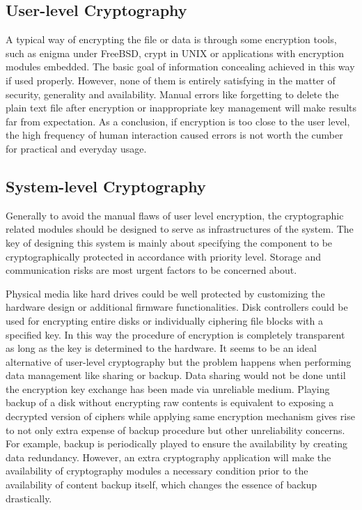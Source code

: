 \subsection{User-level Cryptography}

A typical way of encrypting the file or data is through some encryption tools, such as enigma under FreeBSD, crypt in UNIX or applications with encryption modules embedded. The basic goal of information concealing achieved in this way if used properly. However, none of them is entirely satisfying in the matter of security, generality and availability\cite{Zhang2010}. Manual errors like forgetting to delete the plain text file after encryption or inappropriate key management will make results far from expectation. As a conclusion, if encryption is too close to the user level, the high frequency of human interaction caused errors is not worth the cumber for practical and everyday usage\cite{Laboratories1993}.

\subsection{System-level Cryptography}

Generally to avoid the manual flaws of user level encryption, the cryptographic related modules should be designed to serve as infrastructures of the system. The key of designing this system is mainly about specifying the component to be cryptographically protected in accordance with priority level. Storage and communication risks are most urgent factors to be concerned about.

Physical media like hard drives could be well protected by customizing the hardware design or additional firmware functionalities. Disk controllers could be used for encrypting entire disks or individually ciphering file blocks with a specified key. In this way the procedure of encryption is completely transparent as long as the key is determined to the hardware\cite{Laboratories1993}. It seems to be an ideal alternative of user-level cryptography but the problem happens when performing data management like sharing or backup. Data sharing would not be done until the encryption key exchange has been made via unreliable medium. Playing backup of a disk without encrypting raw contents is equivalent to exposing a decrypted version of ciphers while applying same encryption mechanism gives rise to not only extra expense of backup procedure but other unreliability concerns. For example, backup is periodically played to ensure the availability by creating data redundancy. However, an extra cryptography application will make the availability of cryptography modules a necessary condition prior to the availability of content backup itself, which changes the essence of backup drastically.

